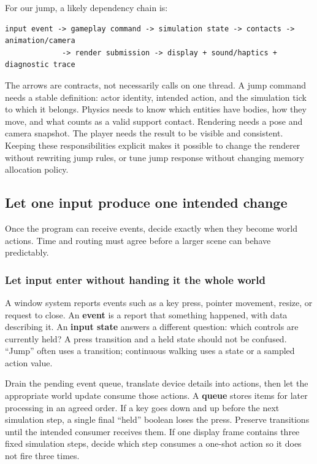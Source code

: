 For our jump, a likely dependency chain is:

\begin{verbatim}
input event -> gameplay command -> simulation state -> contacts -> animation/camera
             -> render submission -> display + sound/haptics + diagnostic trace
\end{verbatim}

The arrows are contracts, not necessarily calls on one thread. A jump command needs a stable definition: actor identity, intended action, and the simulation tick to which it belongs. Physics needs to know which entities have bodies, how they move, and what counts as a valid support contact. Rendering needs a pose and camera snapshot. The player needs the result to be visible and consistent. Keeping these responsibilities explicit makes it possible to change the renderer without rewriting jump rules, or tune jump response without changing memory allocation policy.

\subsection{Let one input produce one intended change}\label{let-one-input-produce-one-intended-change}

Once the program can receive events, decide exactly when they become world actions. Time and routing must agree before a larger scene can behave predictably.

\subsubsection{Let input enter without handing it the whole world}\label{let-input-enter-without-handing-it-the-whole-world}

A window system reports events such as a key press, pointer movement, resize, or request to close. An \textbf{event} is a report that something happened, with data describing it. An \textbf{input state} answers a different question: which controls are currently held? A press transition and a held state should not be confused. ``Jump'' often uses a transition; continuous walking uses a state or a sampled action value.

Drain the pending event queue, translate device details into actions, then let the appropriate world update consume those actions. A \textbf{queue} stores items for later processing in an agreed order. If a key goes down and up before the next simulation step, a single final ``held'' boolean loses the press. Preserve transitions until the intended consumer receives them. If one display frame contains three fixed simulation steps, decide which step consumes a one-shot action so it does not fire three times.

